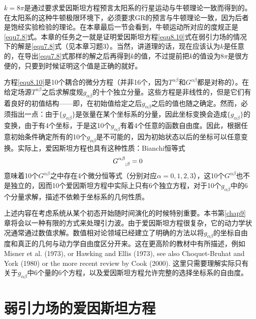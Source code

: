 $k = 8\pi$是通过要求爱因斯坦方程预言太阳系的行星运动与牛顿理论一致而得到的。在太阳系的这种牛顿极限环境下，必须要求GR的预言与牛顿理论一致，因为后者是饱经实验检验的理论。在本章最后一节会看到，牛顿运动所对应的度规正是\eqref{equ7.8}式。本章的任务之一就是证明爱因斯坦方程\eqref{equ8.10}式在弱引力场的情况下的解是\eqref{equ7.8}式（见本章习题3）。当然，讲道理的话，现在应该认为$k$是任意的，在导出\eqref{equ7.8}式那样的解之后再得到$k$的值，不过提前把$k$的值设为$8 \pi$是很方便的，只要到时候证明这个值是正确的就好。

方程\eqref{equ8.10}是10个耦合的微分方程（并非16个，因为$T^{\alpha \beta}$和$G^{\alpha \beta}$都是对称的）。在给定场源$T^{\alpha \beta}$之后求解度规$g_{\alpha \beta}$的十个独立分量。这些方程是非线性的，但是它们有着良好的初值结构——即，在初始值给定之后$g_{\alpha \beta}$之后的值也随之确定。然而，必须指出一点：由于$\{ g_{\alpha \beta} \}$是张量在某个坐标系的分量，因此坐标变换会造成$\{ g_{\alpha \beta} \}$的变换，由于有4个坐标，于是这10个$g_{\alpha \beta}$有着4个任意的函数自由度。因此，根据任意初始条件确定所有的10个$g_{\alpha \beta}$是不可能的，因为初始状态以后的坐标可以任意变换。实际上，爱因斯坦方程也具有这种性质：Bianchi恒等式
\begin{equation}
    G\indices{^{\alpha \beta}_{; \beta}} = 0
\label{equ8.11}
\end{equation}
意味着10个$G^{\alpha \beta}$之中存在4个微分恒等式（分别对应$\alpha = 0, 1, 2, 3$），这10个$G^{\alpha \beta}$也不是独立的，因而10个爱因斯坦方程中实际上只有6个独立方程，对于10个$g_{\alpha \beta}$中的6个分量求解，描述不依赖于坐标系的几何性质。

上述内容在考虑系统从某个初态开始随时间演化的时候特别重要。本书第\ref{chap9}章将会以一种有限的方式来处理引力波。由于爱因斯坦方程很复杂，它的动力学状况通常通过数值求解。数值相对论领域已经建立了明确的方法以将$g_{\alpha \beta}$的坐标自由度和真正的几何与动力学自由度区分开来。这在更高阶的教材中有所描述，例如 Misner et al. (1973), or Hawking and Ellis (1973), see also Choquet-Bruhat and York (1980) or the more recent review by Cook (2000). 这里只需要理解实际只有关于$g_{\alpha \beta}$中6个量的6个方程，以及爱因斯坦方程允许完整的选择坐标系的自由度。

\section{弱引力场的爱因斯坦方程}
\label{sec8.3}

